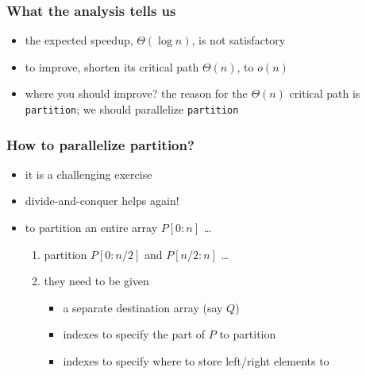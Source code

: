 \documentclass[12pt,dvipdfmx]{beamer}
\newcommand{\ao}[1]{{\color{blue}#1}}
\begin{document}
\begin{frame}
\frametitle{What the analysis tells us}
\begin{itemize}
\item the expected speedup, \ao{$\Theta(\log n)$}, is not satisfactory
\item to improve, shorten its critical path \ao{$\Theta(n)$}, to \ao{$o(n)$}
\item where you should improve? the reason for the $\Theta(n)$ critical path
  is \ao{\texttt{partition}}; we should parallelize \ao{\texttt{partition}}
\end{itemize}

\begin{center}
\def\svgwidth{0.7\textwidth}

\end{center}
\end{frame}


\begin{frame}
\frametitle{How to parallelize partition?}
\begin{itemize}
\item it is a challenging exercise
\item divide-and-conquer helps again!
\item<1-> to partition an entire array $P[0:n]$ \ldots
  \begin{enumerate}
  \item<2-> partition $P[0:n/2]$ and $P[n/2:n]$ \ldots
  \item<3-> they need to be given
    \begin{itemize}
    \item<4-> a separate destination array (say $Q$)
    \item<5-> indexes to specify the part of $P$ to partition
    \item<6-> indexes to specify where to store left/right elements to
    \end{itemize}
  \end{enumerate}
\end{itemize}

\end{frame}
\end{document}
